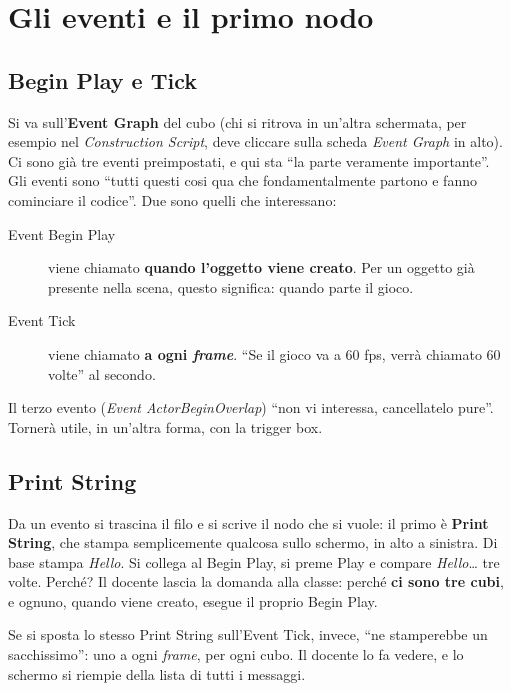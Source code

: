\section{Gli eventi e il primo nodo}
\label{gd7:sec:eventi}

\subsection{Begin Play e Tick}

Si va sull'\textbf{Event Graph} del cubo (chi si ritrova in un'altra
schermata, per esempio nel \emph{Construction Script}, deve cliccare sulla
scheda \emph{Event Graph} in alto). Ci sono già tre eventi preimpostati, e
qui sta ``la parte veramente importante''. Gli eventi sono ``tutti questi
cosi qua che fondamentalmente partono e fanno cominciare il codice''. Due
sono quelli che interessano:
\begin{description}
  \item[Event Begin Play] viene chiamato \textbf{quando l'oggetto viene
        creato}. Per un oggetto già presente nella scena, questo significa:
        quando parte il gioco.
  \item[Event Tick] viene chiamato \textbf{a ogni \emph{frame}}. ``Se il
        gioco va a 60 fps, verrà chiamato 60 volte'' al secondo.
\end{description}
Il terzo evento (\emph{Event ActorBeginOverlap}) ``non vi interessa,
cancellatelo pure''. Tornerà utile, in un'altra forma, con la trigger box.

\subsection{Print String}

Da un evento si trascina il filo e si scrive il nodo che si vuole: il primo è
\textbf{Print String}, che stampa semplicemente qualcosa sullo schermo,
in alto a sinistra. Di base stampa \emph{Hello}. Si collega al Begin Play, si
preme Play e compare \emph{Hello}\dots{} tre volte. Perché? Il docente lascia
la domanda alla classe: perché \textbf{ci sono tre cubi}, e ognuno, quando
viene creato, esegue il proprio Begin Play.

Se si sposta lo stesso Print String sull'Event Tick, invece, ``ne stamperebbe
un sacchissimo'': uno a ogni \emph{frame}, per ogni cubo. Il docente lo fa
vedere, e lo schermo si riempie della lista di tutti i messaggi.

